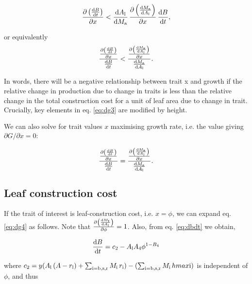 \documentclass[a4paper,11pt]{article}
\begin{document}
\begin{appendices}
\begin{equation}\label{eq:dg3}
\frac{\partial \left( \frac{ {\rm d}B} {{\rm d}t}\right)}{\partial x}
< \frac{{\rm d}A_{\rm l}} {{\rm d}M_{\rm a}}
\,  \frac{\partial \left(\frac{{\rm d}M_{\rm a}} {{\rm d}A_{\rm l}}\right)
}{\partial x} \, \frac{ {\rm d}B} {{\rm d}t},
\end{equation}

or equivalently
\begin{equation}\label{eq:dg4}
\frac{
\frac{\partial \left( \frac{ {\rm d}B} {{\rm d}t}\right)}{\partial x} }
{\frac{ {\rm d}B} {{\rm d}t}}
<
\frac{ \frac{\partial \left(\frac{{\rm d}M_{\rm a}} {{\rm d}A_{\rm l}}\right)
}{\partial x}}{\frac{{\rm d}M_{\rm a}} {{\rm d}A_{\rm l}}}.
\end{equation}

In words, there will be a negative relationship between trait x and growth if the
relative change in production due to change in traits is less than the relative change
in the total construction cost for a unit of leaf area due to change in trait. Crucially,
key elements in eq. \ref{eq:dg3} are modified by height.

We can also solve for trait values $x$ maximising growth rate, i.e. the value
giving $\partial G /\partial x = 0$:

\begin{equation}\label{eq:max}
\frac{
\frac{\partial \left( \frac{ {\rm d}B} {{\rm d}t}\right)}{\partial x} }
{\frac{ {\rm d}B} {{\rm d}t}}
=
\frac{ \frac{\partial \left(\frac{{\rm d}M_{\rm a}} {{\rm d}A_{\rm l}}\right)
}{\partial x}}{\frac{{\rm d}M_{\rm a}} {{\rm d}A_{\rm l}}}.
\end{equation}

\subsection{Leaf construction cost}

If the trait of interest is leaf-construction cost, i.e. $x=\phi$, we can expand
eq. \ref{eq:dg4} as follows. Note that $\frac{\partial \left(\frac{{\rm d}M_\textrm
{t}} {{\rm d}A_{\rm l}}\right)}{\partial \phi} = 1$. Also, from eq. \ref{eq:dbdt} we obtain,

\begin{equation}\label{eq:dbdt2}
\frac{{\rm d}B}{{\rm d}t} = c_2 - A_{\rm l} A_4 \phi ^{1-B_4}
\end{equation}

where
$c_2 = y ( A_{\rm l} \, (A - r_{\rm l}) + \sum_\textrm{i=b,s,r}{M_\textrm{i} \, r_\textrm{i}}) - (\sum_\textrm{i=b,s,r}{M_\textrm{i} \, hmax\textrm{i}})$
is independent of $\phi$, and thus


\end{appendices}
\end{document}
